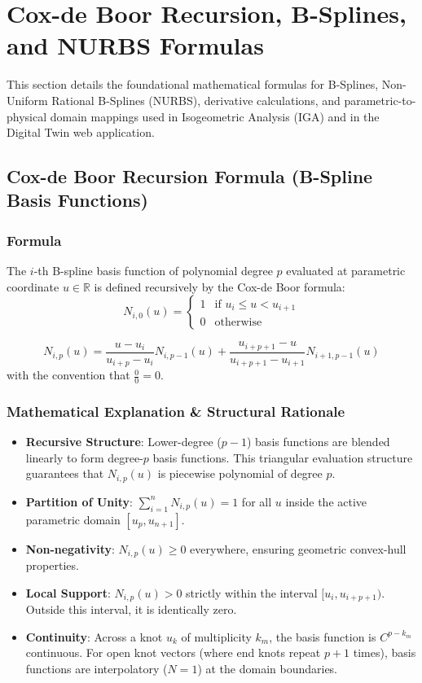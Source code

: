 \section{Cox-de Boor Recursion, B-Splines, and NURBS Formulas}
\label{sec:nurbs}

This section details the foundational mathematical formulas for B-Splines, Non-Uniform Rational B-Splines (NURBS), derivative calculations, and parametric-to-physical domain mappings used in Isogeometric Analysis (IGA) and in the Digital Twin web application.

\subsection{Cox-de Boor Recursion Formula (B-Spline Basis Functions)}

\subsubsection{Formula}
The $i$-th B-spline basis function of polynomial degree $p$ evaluated at parametric coordinate $u \in \mathbb{R}$ is defined recursively by the Cox-de Boor formula:
\begin{equation}
N_{i,0}(u) = \begin{cases} 
1 & \text{if } u_i \le u < u_{i+1} \\ 
0 & \text{otherwise} 
\end{cases}
\end{equation}

\begin{equation}
N_{i,p}(u) = \frac{u - u_i}{u_{i+p} - u_i} N_{i,p-1}(u) + \frac{u_{i+p+1} - u}{u_{i+p+1} - u_{i+1}} N_{i+1,p-1}(u)
\end{equation}
with the convention that $\frac{0}{0} = 0$.

\subsubsection{Mathematical Explanation \& Structural Rationale}
\begin{itemize}
    \item \textbf{Recursive Structure}: Lower-degree ($p-1$) basis functions are blended linearly to form degree-$p$ basis functions. This triangular evaluation structure guarantees that $N_{i,p}(u)$ is piecewise polynomial of degree $p$.
    \item \textbf{Partition of Unity}: $\sum_{i=1}^n N_{i,p}(u) = 1$ for all $u$ inside the active parametric domain $[u_p, u_{n+1}]$.
    \item \textbf{Non-negativity}: $N_{i,p}(u) \ge 0$ everywhere, ensuring geometric convex-hull properties.
    \item \textbf{Local Support}: $N_{i,p}(u) > 0$ strictly within the interval $[u_i, u_{i+p+1})$. Outside this interval, it is identically zero.
    \item \textbf{Continuity}: Across a knot $u_k$ of multiplicity $k_m$, the basis function is $C^{p - k_m}$ continuous. For open knot vectors (where end knots repeat $p+1$ times), basis functions are interpolatory ($N = 1$) at the domain boundaries.
\end{itemize}

